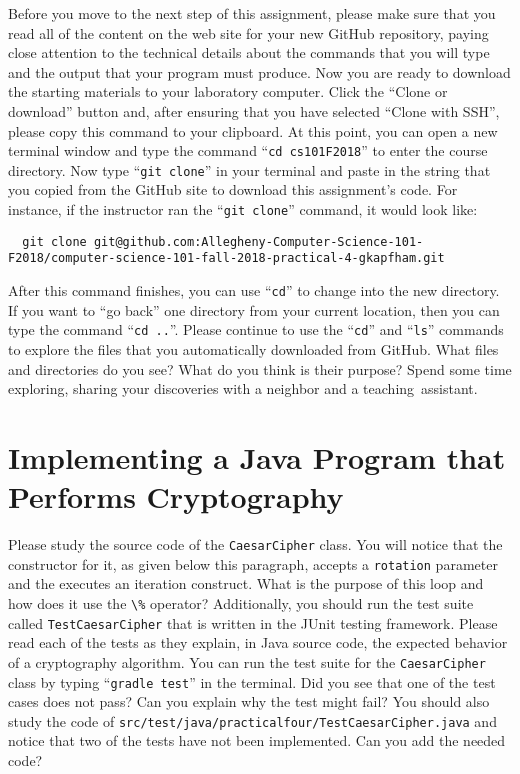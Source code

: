 \documentclass[11pt]{article}
\newcommand{\mainprogram}{\lstinline{CaesarCipher}}
\newcommand{\testprogram}{\lstinline{TestCaesarCipher}}
\newcommand{\testprogramsource}{\lstinline{src/test/java/practicalfour/TestCaesarCipher.java}}
\newcommand{\gradletest}{\command{gradle test}}
\newcommand{\command}[1]{``\lstinline{#1}''}
\newcommand{\program}[1]{\lstinline{#1}}
\newcommand{\step}[1]{``{#1}''}
\begin{document}
Before you move to the next step of this assignment, please make sure that you
read all of the content on the web site for your new GitHub repository, paying
close attention to the technical details about the commands that you will type
and the output that your program must produce. Now you are ready to download the
starting materials to your laboratory computer. Click the ``Clone or download''
button and, after ensuring that you have selected ``Clone with SSH'', please
copy this command to your clipboard. At this point, you can open a new terminal
window and type the command \command{cd cs101F2018} to enter the course
directory. Now type \command{git clone} in your terminal and paste in the string
that you copied from the GitHub site to download this assignment's code. For
instance, if the instructor ran the \command{git clone} command, it would look
like:

\begin{lstlisting}
  git clone git@github.com:Allegheny-Computer-Science-101-F2018/computer-science-101-fall-2018-practical-4-gkapfham.git
\end{lstlisting}

After this command finishes, you can use \command{cd} to change into the new
directory. If you want to \step{go back} one directory from your current
location, then you can type the command \command{cd ..}. Please continue to use
the \command{cd} and \command{ls} commands to explore the files that you
automatically downloaded from GitHub. What files and directories do you see?
What do you think is their purpose? Spend some time exploring, sharing your
discoveries with a neighbor and a \mbox{teaching assistant}.

\section*{Implementing a Java Program that Performs Cryptography}

Please study the source code of the \mainprogram{} class. You will notice that
the constructor for it, as given below this paragraph, accepts a
\program{rotation} parameter and the executes an iteration construct. What is
the purpose of this loop and how does it use the \program{\%} operator?
Additionally, you should run the test suite called \testprogram{} that is
written in the JUnit testing framework. Please read each of the tests as they
explain, in Java source code, the expected behavior of a cryptography algorithm.
You can run the test suite for the \mainprogram{} class by typing \gradletest{}
in the terminal. Did you see that one of the test cases does not pass? Can you
explain why the test might fail? You should also study the code of
\testprogramsource{} and notice that two of the tests have not been implemented.
Can you add the needed code?
\end{document}
